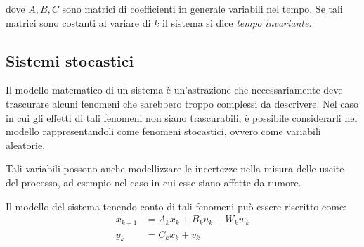 dove $A,B,C$ sono matrici di coefficienti in generale variabili nel tempo. Se tali matrici sono costanti al variare di $k$ il sistema si dice \textit{tempo invariante}.
\newpage

\subsection{Sistemi stocastici}

Il modello matematico di un sistema è un'astrazione che necessariamente deve trascurare alcuni fenomeni che sarebbero troppo complessi da descrivere. Nel caso in cui gli effetti di tali fenomeni non siano trascurabili, è possibile considerarli nel modello rappresentandoli come fenomeni stocastici, ovvero come variabili aleatorie.

Tali variabili possono anche modellizzare le incertezze nella misura delle uscite del processo, ad esempio nel caso in cui esse siano affette da rumore.

Il modello del sistema tenendo conto di tali fenomeni può essere riscritto come:
\begin{subequations}
\label{rumlinsys}
\begin{align}\label{rumlinsys1}
x_{k+1} &= A_kx_k + B_ku_k + W_kw_k \\
\label{rumlinsys2}
y_k &= C_kx_k + v_k
\end{align}
\end{subequations}

